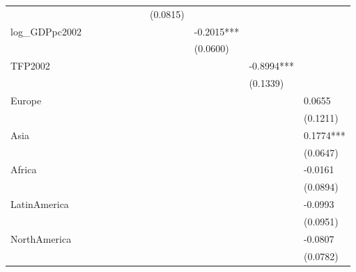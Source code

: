 \begin{table}
\begin{center}
\begin{tabular}{lllllllllll}
               &            &            &          &           &          &          & (0.0815) &            &            &            \\
log\_GDPpc2002 &            &            &          &           &          &          &          & -0.2015*** &            &            \\
               &            &            &          &           &          &          &          & (0.0600)   &            &            \\
TFP2002        &            &            &          &           &          &          &          &            & -0.8994*** &            \\
               &            &            &          &           &          &          &          &            & (0.1339)   &            \\
Europe         &            &            &          &           &          &          &          &            &            & 0.0655     \\
               &            &            &          &           &          &          &          &            &            & (0.1211)   \\
Asia           &            &            &          &           &          &          &          &            &            & 0.1774***  \\
               &            &            &          &           &          &          &          &            &            & (0.0647)   \\
Africa         &            &            &          &           &          &          &          &            &            & -0.0161    \\
               &            &            &          &           &          &          &          &            &            & (0.0894)   \\
LatinAmerica   &            &            &          &           &          &          &          &            &            & -0.0993    \\
               &            &            &          &           &          &          &          &            &            & (0.0951)   \\
NorthAmerica   &            &            &          &           &          &          &          &            &            & -0.0807    \\
               &            &            &          &           &          &          &          &            &            & (0.0782)   \\

\end{tabular}
\end{center}
\end{table}
